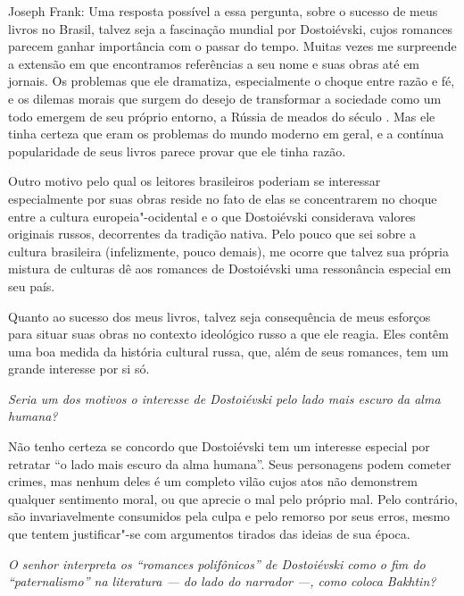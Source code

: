 \noindent
{}Joseph Frank: Uma resposta possível a essa pergunta, sobre o
sucesso de meus livros no Brasil, talvez seja a fascinação mundial por
Dostoiévski, cujos romances parecem ganhar importância com o passar do
tempo. Muitas vezes me surpreende a extensão em que encontramos
referências a seu nome e suas obras até em jornais. Os problemas que ele
dramatiza, especialmente o choque entre razão e fé, e os dilemas morais
que surgem do desejo de transformar a sociedade como um todo
emergem de seu próprio entorno, a Rússia de meados do século . Mas ele
tinha certeza que eram os problemas do mundo moderno em geral, e a
contínua popularidade de seus livros parece provar que ele tinha razão.

Outro motivo pelo qual os leitores brasileiros poderiam se interessar
especialmente por suas obras reside no fato de elas se concentrarem no choque entre
a cultura europeia"-ocidental e o que Dostoiévski considerava valores
originais russos, decorrentes da tradição nativa. Pelo pouco que sei
sobre a cultura brasileira (infelizmente, pouco demais), me
ocorre que talvez sua própria mistura de culturas dê aos romances de
Dostoiévski uma ressonância especial em seu país.

Quanto ao sucesso dos meus livros, talvez seja consequência de meus
esforços para situar suas obras no contexto ideológico russo a que ele
reagia. Eles contêm uma boa medida da história cultural russa, que, além
de seus romances, tem um grande interesse por si só.

\medskip

\emph{Seria um dos motivos o interesse de Dostoiévski pelo lado mais
escuro da alma humana?}

Não tenho certeza se concordo que Dostoiévski tem um interesse
especial por retratar ``o lado mais escuro da alma humana''. Seus
personagens podem cometer crimes, mas nenhum deles é um completo vilão
cujos atos não demonstrem qualquer sentimento moral, ou que aprecie o
mal pelo próprio mal. Pelo contrário, são invariavelmente
consumidos pela culpa e pelo remorso por seus erros, mesmo que
tentem justificar"-se com argumentos tirados das ideias de sua época.

\medskip

\emph{O senhor interpreta os ``romances polifônicos'' de Dostoiévski como
o fim do ``paternalismo'' na literatura --- do lado do narrador ---,
como coloca Bakhtin?}

